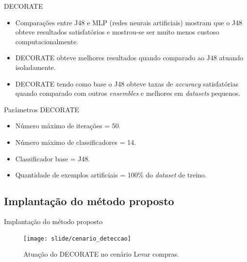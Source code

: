 \documentclass[brazil]{beamer}
\begin{document}
\begin{frame}{DECORATE \cite{Melville:2003, Melville:2004}}
   \begin{itemize}
      \item <1 ->Comparações \cite{Firdausi:2010, Arora:2012, Karthikeyan:2013} entre J48 \cite{Hall:2009} e MLP (redes neurais artificiais) mostram que o J48 obteve resultados satisfatórios e mostrou-se ser muito menos custoso computacionalmente.
\justifying
      \item <2 ->DECORATE obteve melhores resultados quando comparado ao J48 atuando isoladamente.
\justifying
      \item <3 ->DECORATE tendo como base o J48 obteve taxas de \textit{accuracy} satisfatórias quando comparado com outros \textit{ensembles} e melhores em \textit{datasets} pequenos.
   \end{itemize}
\end{frame}

\begin{frame}{Parâmetros DECORATE \cite{Melville:2004}}
   \begin{itemize}
\justifying
      \item <1 ->Número máximo de iterações = 50.
      \item <2 ->Número máximo de classificadores = 14.
      \item <3 ->Classificador base = J48. 
      \item <4 ->Quantidade de exemplos artificiais = 100\% do \textit{dataset} de treino.
   \end{itemize}
\end{frame}


\subsection{Implantação do método proposto}
\begin{frame}{Implantação do método proposto}
\begin{figure}[!htb] \centering 
  \centering
  \texttt{[image: slide/cenario\_deteccao]} 
  \caption{Atuação do DECORATE no cenário Levar compras.} 
  \label{fig:cenario_deteccao}
\end{figure}
\end{frame}
\end{document}
